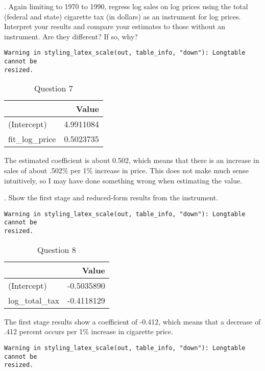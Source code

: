 \documentclass[
  letterpaper,
  DIV=11,
  numbers=noendperiod]{scrartcl}
\begin{document}
\newpage

. Again limiting to 1970 to 1990, regress log sales on log
prices using the total (federal and state) cigarette tax (in dollars) as
an instrument for log prices. Interpret your results and compare your
estimates to those without an instrument. Are they different? If so,
why?

\begin{verbatim}
Warning in styling_latex_scale(out, table_info, "down"): Longtable cannot be
resized.
\end{verbatim}

\begin{longtable}[t]{lr}
\caption{Question 7}\tabularnewline

\toprule
 & Value\\
\midrule
(Intercept) & 4.9911084\\
fit\_log\_price & 0.5023735\\
\bottomrule
\end{longtable}

The estimated coefficient is about 0.502, which means that there is an
increase in sales of about .502\% per 1\% increase in price. This does
not make much sense intuitively, so I may have done something wrong when
estimating the value.

\newpage

. Show the first stage and reduced-form results from the
instrument.

\begin{verbatim}
Warning in styling_latex_scale(out, table_info, "down"): Longtable cannot be
resized.
\end{verbatim}

\begin{longtable}[t]{lr}
\caption{Question 8}\tabularnewline

\toprule
 & Value\\
\midrule
(Intercept) & -0.5035890\\
log\_total\_tax & -0.4118129\\
\bottomrule
\end{longtable}

The first stage results show a coefficient of -0.412, which means that a
decrease of .412 percent occurs per 1\% increase in cigarette price.

\begin{verbatim}
Warning in styling_latex_scale(out, table_info, "down"): Longtable cannot be
resized.
\end{verbatim}
\end{document}
